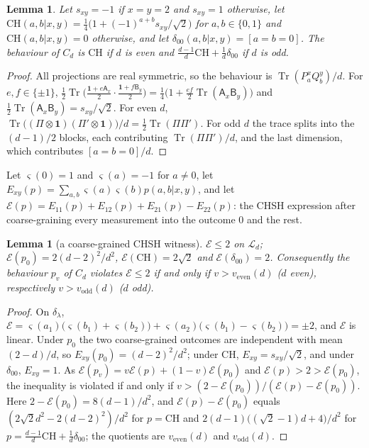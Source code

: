\documentclass[11pt]{amsart}
\newtheorem{lemma}[theorem]{Lemma}
\theoremstyle{definition}
\theoremstyle{remark}
\numberwithin{equation}{section}
\newcommand{\Tr}{\operatorname{Tr}}
\newcommand{\one}{\mathbf{1}}
\newcommand{\cL}{\mathcal{L}}
\newcommand{\veven}{v_{\mathrm{even}}}
\newcommand{\vodd}{v_{\mathrm{odd}}}
\newcommand{\CH}{\mathrm{CH}}
\begin{document}
\begin{lemma}\label{lem:Cbeh}
Let $s_{xy}=-1$ if $x=y=2$ and $s_{xy}=1$ otherwise, let $\CH(a,b|x,y)=\frac14\bigl(1+(-1)^{a+b}s_{xy}/\sqrt2\bigr)$ for
$a,b\in\{0,1\}$ and $\CH(a,b|x,y)=0$ otherwise, and let $\delta_{00}(a,b|x,y)=[a=b=0]$. The behaviour of $C_d$ is $\CH$
if $d$ is even and $\frac{d-1}d\CH+\frac1d\delta_{00}$ if $d$ is odd.
\end{lemma}

\begin{proof}
All projections are real symmetric, so the behaviour is $\Tr(P^x_aQ^y_b)/d$. For $e,f\in\{\pm1\}$,
$\frac12\Tr\bigl(\frac{\one+e\mathsf A_x}2\cdot\frac{\one+f\mathsf B_y}2\bigr)=\frac14\bigl(1+\frac{ef}2\Tr(\mathsf A_x\mathsf B_y)\bigr)$
and $\frac12\Tr(\mathsf A_x\mathsf B_y)=s_{xy}/\sqrt2$. For even $d$,
$\Tr\bigl((\Pi\otimes\one)(\Pi'\otimes\one)\bigr)/d=\frac12\Tr(\Pi\Pi')$. For odd $d$ the trace splits into the
$(d-1)/2$ blocks, each contributing $\Tr(\Pi\Pi')/d$, and the last dimension, which contributes $[a=b=0]/d$.
\end{proof}

Let $\varsigma(0)=1$ and $\varsigma(a)=-1$ for $a\ne0$, let $E_{xy}(p)=\sum_{a,b}\varsigma(a)\varsigma(b)p(a,b|x,y)$, and
let $\mathcal E(p)=E_{11}(p)+E_{12}(p)+E_{21}(p)-E_{22}(p)$: the CHSH expression after coarse-graining every measurement
into the outcome $0$ and the rest.

\begin{lemma}[a coarse-grained CHSH witness]\label{lem:witness}
$\mathcal E\le2$ on $\cL_d$; $\mathcal E(p_0)=2(d-2)^2/d^2$, $\mathcal E(\CH)=2\sqrt2$ and $\mathcal E(\delta_{00})=2$.
Consequently the behaviour $p_v$ of $C_d$ violates $\mathcal E\le2$ if and only if $v>\veven(d)$ ($d$ even),
respectively $v>\vodd(d)$ ($d$ odd).
\end{lemma}

\begin{proof}
On $\delta_\lambda$, $\mathcal E=\varsigma(a_1)\bigl(\varsigma(b_1)+\varsigma(b_2)\bigr)+\varsigma(a_2)\bigl(\varsigma(b_1)-\varsigma(b_2)\bigr)=\pm2$,
and $\mathcal E$ is linear. Under $p_0$ the two coarse-grained outcomes are independent with mean $(2-d)/d$, so
$E_{xy}(p_0)=(d-2)^2/d^2$; under $\CH$, $E_{xy}=s_{xy}/\sqrt2$, and under $\delta_{00}$, $E_{xy}=1$. As
$\mathcal E(p_v)=v\mathcal E(p)+(1-v)\mathcal E(p_0)$ and $\mathcal E(p)>2>\mathcal E(p_0)$, the inequality is violated if
and only if $v>(2-\mathcal E(p_0))/(\mathcal E(p)-\mathcal E(p_0))$. Here $2-\mathcal E(p_0)=8(d-1)/d^2$, and
$\mathcal E(p)-\mathcal E(p_0)$ equals $(2\sqrt2d^2-2(d-2)^2)/d^2$ for $p=\CH$ and $2(d-1)\bigl((\sqrt2-1)d+4\bigr)/d^2$
for $p=\frac{d-1}d\CH+\frac1d\delta_{00}$; the quotients are $\veven(d)$ and $\vodd(d)$.
\end{proof}
\end{document}
